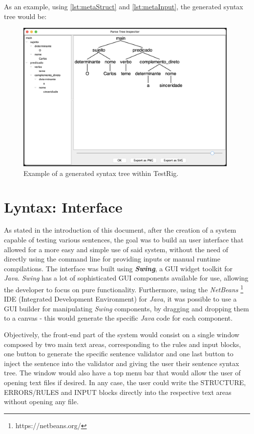 \noindent As an example, using \autoref{lst:metaStruct} and \autoref{lst:metaInput}, the generated syntax tree would be:
\begin{figure}[h]
    \centering
    \includegraphics[width=11cm]{images/testrig_gui_example.png}
    \caption{Example of a generated syntax tree within TestRig.}
    \label{fig:testrigGuiExample}
\end{figure}

\newpage
\section{Lyntax: Interface}

As stated in the introduction of this document, after the creation of a system capable of testing various sentences, the goal was to build an user interface
that allowed for a more easy and simple use of said system, without the need of directly using the command line for providing inputs or manual runtime compilations.
The interface was built using \emph{\textbf{Swing}}, a GUI widget toolkit for \emph{Java}.
\emph{Swing} has a lot of sophisticated GUI components available for use, allowing the developer to focus on pure functionality.
Furthermore, using the \emph{NetBeans} \footnote{https://netbeans.org/} IDE (Integrated Development Environment) for \emph{Java}, it was possible to use a GUI builder for manipulating \emph{Swing} components, 
by dragging and dropping them to a canvas - this would generate the specific \emph{Java} code for each component.

Objectively, the front-end part of the system would consist on a single window composed by two main text areas, corresponding to the rules and input blocks,
one button to generate the specific sentence validator and one last button to inject the sentence into the validator and giving the user their sentence syntax tree.
The window would also have a top menu bar that would allow the user of opening text files if desired.
In any case, the user could write the STRUCTURE, ERRORS/RULES and INPUT blocks directly into the respective text areas without opening any file. 

